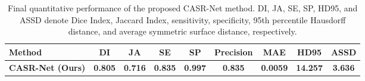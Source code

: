 \begin{table}[t]
\centering
\caption{Final quantitative performance of the proposed CASR-Net method. DI, JA, SE, SP, HD95, and ASSD denote Dice Index, Jaccard Index, sensitivity, specificity, 95th percentile Hausdorff distance, and average symmetric surface distance, respectively.}
\label{tab:casrnet_final_metrics}
\begin{tabular}{lcccccccc}
\hline
Method & DI & JA & SE & SP & Precision & MAE & HD95 & ASSD \\
\hline
\textbf{CASR-Net (Ours)} & \textbf{0.805} & \textbf{0.716} & \textbf{0.835} & \textbf{0.997} & \textbf{0.835} & \textbf{0.0059} & \textbf{14.257} & \textbf{3.636} \\
\hline
\end{tabular}
\end{table}
